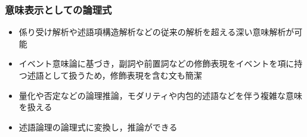 \documentclass[dvipdfmx]{beamer}
\newcommand{\LF}[1]{\ensuremath{\texttt{#1}}}
\begin{document}


\begin{frame}
\frametitle{意味表示としての論理式}

\begin{itemize}
 \item 係り受け解析や述語項構造解析などの従来の解析を超える深い意味解析が可能
 \item イベント意味論に基づき，副詞や前置詞などの修飾表現をイベントを項に持つ述語として扱うため，修飾表現を含む文も簡潔
 \item 量化や否定などの論理推論，モダリティや内包的述語などを伴う複雑な意味を扱える
 \item 述語論理の論理式に変換し，推論ができる
\end{itemize}
 \end{frame}
\end{document}
